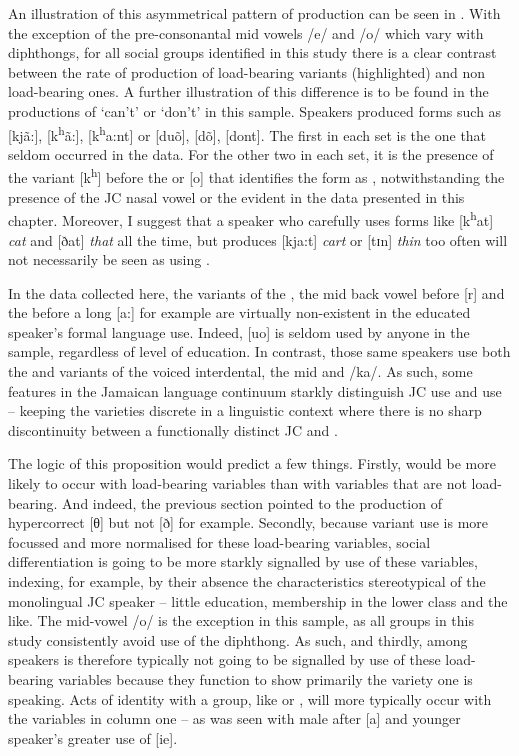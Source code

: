  An illustration of this asymmetrical pattern of production can be seen in .  With the exception of the pre-consonantal mid vowels /e/ and /o/ which vary with diphthongs, for all social groups identified in this study there is a clear contrast between the rate of production of load-bearing variants (highlighted) and non load-bearing ones.  A further illustration of this difference is to be found in the productions of ‘can’t’ or ‘don’t’ in this sample.  Speakers produced forms such as [kjã:], [k\textsuperscript{h}ã:], [k\textsuperscript{h}a:nt] or [duõ], [dõ], [dont].  The first in each set is the one that seldom occurred in the data.  For the other two in each set, it is the presence of the variant [k\textsuperscript{h}] before the  or [o] that identifies the form as , notwithstanding the presence of the JC nasal vowel or the  evident in the data presented in this chapter.  Moreover, I suggest that a speaker who carefully uses forms like [k\textsuperscript{h}at] \textit{cat} and [ðat] \textit{that} all the time, but produces [kja:t] \textit{cart} or [tɪn] \textit{thin} too often will not necessarily be seen as using .

In the data collected here, the  variants of the , the mid back vowel before [r] and the  before a long [a:] for example are virtually non-existent in the educated speaker's formal language use.  Indeed, [uo] is seldom used by anyone in the sample, regardless of level of education.  In contrast, those same speakers use both the  and  variants of the voiced interdental, the mid  and /ka/.  As such, some features in the Jamaican language continuum starkly distinguish JC use and  use – keeping the varieties discrete in a linguistic context where there is no sharp discontinuity between a functionally distinct JC and . 

The logic of this proposition would predict a few things.  Firstly,  would be more likely to occur with load-bearing variables than with variables that are not load-bearing.  And indeed, the previous section point\-ed to the production of hypercorrect [θ] but not [ð] for example.  Secondly, because variant use is more focussed and more normalised for these load-bearing variables, social differentiation is going to be more starkly signalled by use of these variables, indexing, for example, by their absence the characteristics stereotypical of the monolingual JC speaker – little education, membership in the lower class and the like.  The mid-vowel /o/ is the exception in this sample, as all groups in this study consistently avoid use of the diphthong.  As such, and thirdly,  among  speakers is therefore typically not going to be signalled by use of these load-bearing variables because they function to show primarily the variety one is speaking.  Acts of identity with a group, like  or , will more typically occur with the variables in column one – as was seen with male  after [a] and younger speaker's greater use of [ie].

